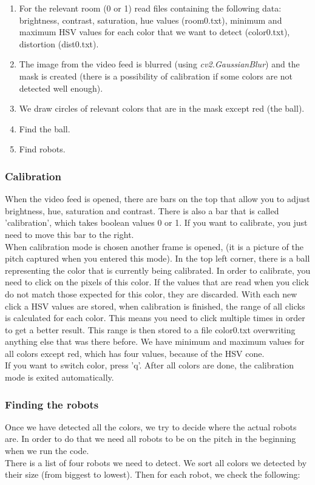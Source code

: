 \documentclass[a4paper,12pt]{article}
\begin{document}
\begin{enumerate}
\item For the relevant room (0 or 1) read files containing the following data: brightness, contrast,     saturation, hue values (room0.txt), minimum and maximum HSV values for each color that we want to detect (color0.txt), distortion (dist0.txt). 
\item The image from the video feed is blurred (using \textit{cv2.GaussianBlur}) and the mask is created (there is a possibility of calibration if some colors are not detected well enough).
\item We draw circles of relevant colors that are in the mask except red (the ball).
\item Find the ball.
\item Find robots.
\end{enumerate}

\subsubsection{Calibration}
When the video feed is opened, there are bars on the top that allow you to adjust brightness, hue, saturation and contrast. There is also a bar that is called 'calibration', which takes boolean values 0 or 
1. If you want to calibrate, you just need to move this bar to the right. 
\\When calibration mode is chosen another frame is opened, (it is a picture of the pitch captured when you entered this mode). In the top left corner, there is a ball representing the color that is currently being calibrated. In order to calibrate, you need to click on the pixels of this color. If the values that are read when you click do not match those expected for this color, they are discarded. With each new click a HSV values are stored, when calibration is finished, the range of all clicks is calculated for each color. This means you need to click multiple times in order to get a better result. This range is then stored to a file color0.txt overwriting anything else that was there before. We have minimum and maximum values for all colors except red, which has four values, because of the HSV cone. 
\\If you want to switch color, press 'q'. After all colors are done, the calibration mode is exited automatically. 

\subsubsection{Finding the robots}
Once we have detected all the colors, we try to decide where the actual robots are. In order to do that we need all robots to be on the pitch in the beginning when we run the code. 
\\There is a list of four robots we need to detect. We sort all colors we detected by their size (from biggest to lowest). Then for each robot, we check the following:
\end{document}
